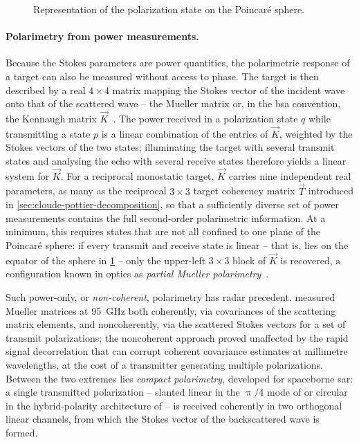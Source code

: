 \begin{figure}[t]
    \centering
    
    \caption{
        Representation of the polarization state on the Poincar\'e sphere.
    }
    \label{fig:poincare-sphere}
\end{figure}

\paragraph{Polarimetry from power measurements.}
Because the Stokes parameters are power quantities, the polarimetric response of a target can also be measured without access to phase.
The target is then described by a real $4 \times 4$ matrix mapping the Stokes vector of the incident wave onto that of the scattered wave -- the Mueller matrix or, in the \gls{bsa} convention, the Kennaugh matrix $\vec K$~\parencite{guissardMuellerKennaughMatrices1994}.
The power received in a polarization state $q$ while transmitting a state $p$ is a linear combination of the entries of $\vec K$, weighted by the Stokes vectors of the two states; illuminating the target with several transmit states and analysing the echo with several receive states therefore yields a linear system for $\vec K$.
For a reciprocal monostatic target, $\vec K$ carries nine independent real parameters, as many as the reciprocal $3 \times 3$ target coherency matrix $\vec T$ introduced in \cref{sec:cloude-pottier-decomposition}, so that a sufficiently diverse set of power measurements contains the full second-order polarimetric information.
At a minimum, this requires states that are not all confined to one plane of the Poincaré sphere: if every transmit and receive state is linear -- that is, lies on the equator of the sphere in \cref{fig:poincare-sphere} -- only the upper-left $3 \times 3$ block of $\vec K$ is recovered, a configuration known in optics as \emph{partial Mueller polarimetry}~\parencite{tyoDesignOptimizationPartial2010}.

Such power-only, or \emph{non-coherent}, polarimetry has radar precedent.
\textcite{meadComparisonCoherentNoncoherent1996} measured Mueller matrices at \qty{95}{GHz} both coherently, via covariances of the scattering matrix elements, and noncoherently, via the scattered Stokes vectors for a set of transmit polarizations; the noncoherent approach proved unaffected by the rapid signal decorrelation that can corrupt coherent covariance estimates at millimetre wavelengths, at the cost of a transmitter generating multiple polarizations.
Between the two extremes lies \emph{compact polarimetry}, developed for spaceborne \gls{sar}: a single transmitted polarization -- slanted linear in the $\uppi/4$ mode of \textcite{souyrisCompactPolarimetryBased2005} or circular in the hybrid-polarity architecture of \textcite{raneyHybridPolaritySARArchitecture2007} -- is received coherently in two orthogonal linear channels, from which the Stokes vector of the backscattered wave is formed.


